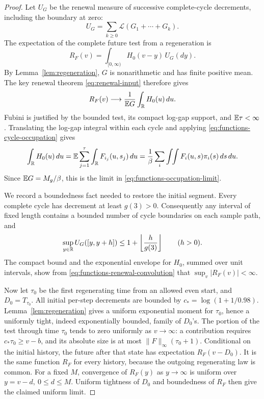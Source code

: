 \begin{proof}
Let \(U_G\) be the renewal measure of successive complete-cycle
decrements, including the boundary at zero:
\[
 U_G=\sum_{k\ge0}\mathcal L(G_1+\cdots+G_k).
\]
The expectation of the complete future test from a regeneration is
\begin{equation}\label{eq:functions-renewal-convolution}
 R_F(v)=\int_{[0,\infty)}H_0(v-y)\,U_G(dy).
\end{equation}
By Lemma~\ref{lem:regeneration}, \(G\) is nonarithmetic and has
finite positive mean.  The key renewal theorem
\eqref{eq:renewal-input} therefore gives
\[
 R_F(v)\longrightarrow \frac1{\mathbb E G}\int_\mathbb R H_0(u)\,du.
\]
Fubini is justified by the bounded test, its compact log-gap
support, and \(\mathbb E\tau<\infty\).  Translating the log-gap integral
within each cycle and applying
\eqref{eq:functions-cycle-occupation} gives
\[
 \int_\mathbb R H_0(u)\,du
 =\mathbb E\sum_{j=1}^{\tau}\int_\mathbb R F_{i_j}(u,s_j)\,du
 =\frac1\beta\sum_i\int\!\!\int F_i(u,s)\pi_i(s)\,ds\,du.
\]
Since \(\mathbb E G=M_g/\beta\), this is the limit in
\eqref{eq:functions-occupation-limit}.

We record a boundedness fact needed to restore the initial segment.
Every complete cycle has decrement at least \(g(3)>0\).
Consequently any interval of fixed length contains a bounded number
of cycle boundaries on each sample path, and
\begin{equation}\label{eq:functions-renewal-band}
 \sup_{y\in\mathbb R}U_G([y,y+h])\le
 1+\left\lfloor\frac{h}{g(3)}\right\rfloor
 \qquad(h>0).
\end{equation}
The compact bound and the exponential envelope for \(H_0\), summed
over unit intervals, show from
\eqref{eq:functions-renewal-convolution} that
\(\sup_v|R_F(v)|<\infty\).

Now let \(\tau_0\) be the first regenerating time from an allowed
even start, and \(D_0=T_{\tau_0}\).
All initial per-step decrements are bounded by
\(c_*=\log(1+1/0.98)\).  Lemma~\ref{lem:regeneration} gives a
uniform exponential moment for \(\tau_0\), hence a uniformly
tight, indeed exponentially bounded, family of \(D_0\)'s.
The portion of the test through time \(\tau_0\) tends to zero
uniformly as \(v\to\infty\): a contribution requires
\(c_*\tau_0\ge v-b\), and its absolute size is at most
\(\|F\|_\infty(\tau_0+1)\).
Conditional on the initial history, the future after that state
has expectation \(R_F(v-D_0)\).
It is the same function \(R_F\) for every history, because the
outgoing regenerating law is common.
For a fixed \(M\), convergence of \(R_F(y)\) as \(y\to\infty\)
is uniform over \(y=v-d,\ 0\le d\le M\).
Uniform tightness of \(D_0\) and boundedness of \(R_F\) then give
the claimed uniform limit.
\end{proof}

